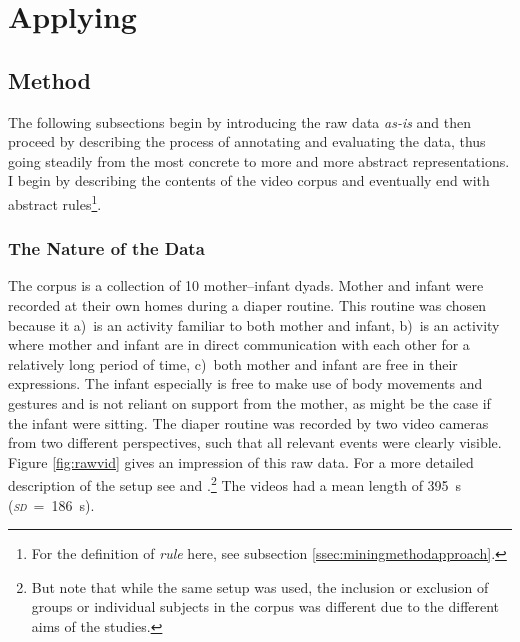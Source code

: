 
\chapter{Applying \fpmupper}
\label{ch:mining}

\section{Method}
\label{sec:miningmethod}
The following subsections begin by introducing the raw data \emph{as-is} and then proceed by describing the process of annotating and evaluating the data, thus going steadily from the most concrete to more and more abstract representations. I begin by describing the contents of the video corpus and eventually end with abstract rules\footnote{For the definition of \emph{rule} here, see subsection \ref{ssec:miningmethodapproach}.}.

\subsection{The Nature of the Data}
\label{ssec:miningmethodnature}
The corpus is a collection of 10 mother--infant dyads. Mother and infant were recorded at their own homes during a diaper routine. This routine was chosen because it a)~is an activity familiar to both mother and infant, b)~is an activity where mother and infant are in direct communication with each other for a relatively long period of time, c)~both mother and infant are free in their expressions. The infant especially is free to make use of body movements and gestures and is not reliant on support from the mother, as might be the case if the infant were sitting. The diaper routine was recorded by two video cameras from two different perspectives, such that all relevant events were clearly visible. Figure \ref{fig:rawvid} gives an impression of this raw data. For a more detailed description of the setup see \citet[]{nomikou17} and \citet[]{nomikou11}.\footnote{But note that while the same setup was used, the inclusion or exclusion of groups or individual subjects in the corpus was different due to the different aims of the studies.} The videos had a mean length of 395~s (\emph{\textsc{sd}}~=~186~s).

